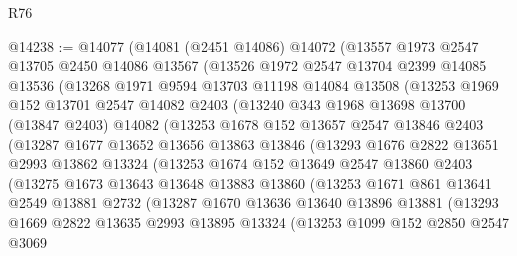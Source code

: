 \begin{lexlean}{R76}
\begin{coremodule}
@14238 := @14077
    (@14081
      (@2451 @14086)
      @14072
      (@13557
        @1973
        @2547
        @13705
        @2450
        @14086
        @13567
        (@13526
          @1972
          @2547
          @13704
          @2399
          @14085
          @13536
          (@13268
            @1971
            @9594
            @13703
            @11198
            @14084
            @13508
            (@13253
              @1969
              @152
              @13701
              @2547
              @14082
              @2403
              (@13240
                @343
                @1968
                @13698
                @13700
                (@13847 @2403)
                @14082
                (@13253
                  @1678
                  @152
                  @13657
                  @2547
                  @13846
                  @2403
                  (@13287
                    @1677
                    @13652
                    @13656
                    @13863
                    @13846
                    (@13293
                      @1676
                      @2822
                      @13651
                      @2993
                      @13862
                      @13324
                      (@13253
                        @1674
                        @152
                        @13649
                        @2547
                        @13860
                        @2403
                        (@13275
                          @1673
                          @13643
                          @13648
                          @13883
                          @13860
                          (@13253
                            @1671
                            @861
                            @13641
                            @2549
                            @13881
                            @2732
                            (@13287
                              @1670
                              @13636
                              @13640
                              @13896
                              @13881
                              (@13293
                                @1669
                                @2822
                                @13635
                                @2993
                                @13895
                                @13324
                                (@13253
                                  @1099
                                  @152
                                  @2850
                                  @2547
                                  @3069

\end{coremodule}
\end{lexlean}
